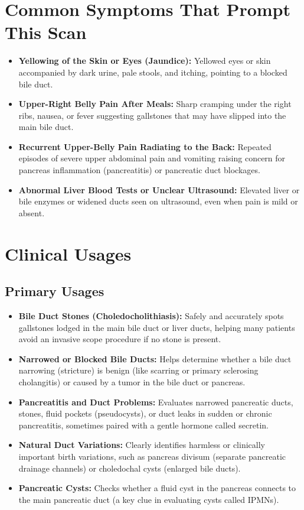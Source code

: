 \section{Common Symptoms That Prompt This Scan}
\begin{itemize}
\item \textbf{Yellowing of the Skin or Eyes (Jaundice):} Yellowed eyes or skin accompanied by dark urine, pale stools, and itching, pointing to a blocked bile duct.
\item \textbf{Upper-Right Belly Pain After Meals:} Sharp cramping under the right ribs, nausea, or fever suggesting gallstones that may have slipped into the main bile duct.
\item \textbf{Recurrent Upper-Belly Pain Radiating to the Back:} Repeated episodes of severe upper abdominal pain and vomiting raising concern for pancreas inflammation (pancreatitis) or pancreatic duct blockages.
\item \textbf{Abnormal Liver Blood Tests or Unclear Ultrasound:} Elevated liver or bile enzymes or widened ducts seen on ultrasound, even when pain is mild or absent.
\end{itemize}

\section{Clinical Usages}

\subsection{Primary Usages}
\begin{itemize}
\item \textbf{Bile Duct Stones (Choledocholithiasis):} Safely and accurately spots gallstones lodged in the main bile duct or liver ducts, helping many patients avoid an invasive scope procedure if no stone is present.
\item \textbf{Narrowed or Blocked Bile Ducts:} Helps determine whether a bile duct narrowing (stricture) is benign (like scarring or primary sclerosing cholangitis) or caused by a tumor in the bile duct or pancreas.
\item \textbf{Pancreatitis and Duct Problems:} Evaluates narrowed pancreatic ducts, stones, fluid pockets (pseudocysts), or duct leaks in sudden or chronic pancreatitis, sometimes paired with a gentle hormone called secretin.
\item \textbf{Natural Duct Variations:} Clearly identifies harmless or clinically important birth variations, such as pancreas divisum (separate pancreatic drainage channels) or choledochal cysts (enlarged bile ducts).
\item \textbf{Pancreatic Cysts:} Checks whether a fluid cyst in the pancreas connects to the main pancreatic duct (a key clue in evaluating cysts called IPMNs).
\end{itemize}

